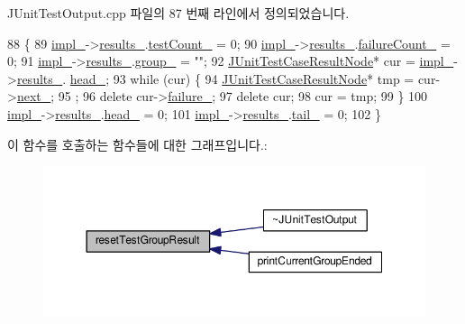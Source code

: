 J\+Unit\+Test\+Output.\+cpp 파일의 87 번째 라인에서 정의되었습니다.


\begin{DoxyCode}
88 \{
89     \hyperlink{class_j_unit_test_output_a123a6133cd44cdaa2c63a519f9fb56f4}{impl\_}->\hyperlink{struct_j_unit_test_output_impl_a4efee5ceef62d8079916e9bd0beb9ba0}{results\_}.\hyperlink{struct_j_unit_test_group_result_ace881ee661bae3d8b8d63b6888f80a36}{testCount\_} = 0;
90     \hyperlink{class_j_unit_test_output_a123a6133cd44cdaa2c63a519f9fb56f4}{impl\_}->\hyperlink{struct_j_unit_test_output_impl_a4efee5ceef62d8079916e9bd0beb9ba0}{results\_}.\hyperlink{struct_j_unit_test_group_result_a006a6550e4e3d4de173c35b50c1c90b0}{failureCount\_} = 0;
91     \hyperlink{class_j_unit_test_output_a123a6133cd44cdaa2c63a519f9fb56f4}{impl\_}->\hyperlink{struct_j_unit_test_output_impl_a4efee5ceef62d8079916e9bd0beb9ba0}{results\_}.\hyperlink{struct_j_unit_test_group_result_ad7a3f1d255163dcdda09624a69079758}{group\_} = \textcolor{stringliteral}{""};
92     \hyperlink{struct_j_unit_test_case_result_node}{JUnitTestCaseResultNode}* cur = \hyperlink{class_j_unit_test_output_a123a6133cd44cdaa2c63a519f9fb56f4}{impl\_}->\hyperlink{struct_j_unit_test_output_impl_a4efee5ceef62d8079916e9bd0beb9ba0}{results\_}.
      \hyperlink{struct_j_unit_test_group_result_ad2d2ef5f012bfb8b2ae3c122935789ed}{head\_};
93     \textcolor{keywordflow}{while} (cur) \{
94         \hyperlink{struct_j_unit_test_case_result_node}{JUnitTestCaseResultNode}* tmp = cur->\hyperlink{struct_j_unit_test_case_result_node_a071cdad5d255e499920e0f7fb745f94a}{next\_};
95         ;
96         \textcolor{keyword}{delete} cur->\hyperlink{struct_j_unit_test_case_result_node_ac7f55ae41ae75d276535c60abc3d7563}{failure\_};
97         \textcolor{keyword}{delete} cur;
98         cur = tmp;
99     \}
100     \hyperlink{class_j_unit_test_output_a123a6133cd44cdaa2c63a519f9fb56f4}{impl\_}->\hyperlink{struct_j_unit_test_output_impl_a4efee5ceef62d8079916e9bd0beb9ba0}{results\_}.\hyperlink{struct_j_unit_test_group_result_ad2d2ef5f012bfb8b2ae3c122935789ed}{head\_} = 0;
101     \hyperlink{class_j_unit_test_output_a123a6133cd44cdaa2c63a519f9fb56f4}{impl\_}->\hyperlink{struct_j_unit_test_output_impl_a4efee5ceef62d8079916e9bd0beb9ba0}{results\_}.\hyperlink{struct_j_unit_test_group_result_a4d358acecdc5260d58b9d2fc96fe107a}{tail\_} = 0;
102 \}
\end{DoxyCode}


이 함수를 호출하는 함수들에 대한 그래프입니다.\+:
\nopagebreak
\begin{figure}[H]
\begin{center}
\leavevmode
\includegraphics[width=350pt]{class_j_unit_test_output_a82e9c2f00229beba58d5a9575c63b7e2_icgraph}
\end{center}
\end{figure}


